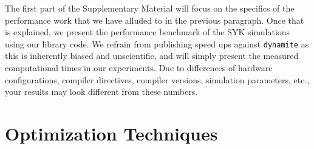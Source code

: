 \documentclass[preprint,12pt]{elsarticle}
\begin{document}
The first part of the Supplementary Material will focus on the specifics of the performance
work that we have alluded to in the previous paragraph. Once that is explained, we present
the performance benchmark of the SYK simulations using our library code. We refrain from
publishing speed ups against {\tt dynamite} as this is inherently biased and unscientific,
and will simply present the measured computational times in our experiments. Due to differences
of hardware configurations, compiler directives, compiler versions, simulation parameters, etc.,
your results may look different from these numbers.

\section{Optimization Techniques}
\end{document}
